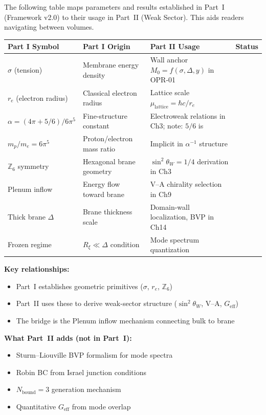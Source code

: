 The following table maps parameters and results established in Part~I (Framework v2.0)
to their usage in Part~II (Weak Sector). This aids readers navigating between volumes.

\begin{tcolorbox}[breakable, enhanced, colback=blue!3!white, colframe=blue!50!black,
    title=\textbf{Part I $\leftrightarrow$ Part II Parameter Bridge}, width=\linewidth]
\small
\renewcommand{\arraystretch}{1.3}
\begin{tabularx}{\linewidth}{@{}>{\raggedright\arraybackslash}p{2.5cm} >{\raggedright\arraybackslash}p{3cm} >{\raggedright\arraybackslash}X >{\raggedright\arraybackslash}p{1.5cm}@{}}
\toprule
\textbf{Part I Symbol} & \textbf{Part I Origin} & \textbf{Part II Usage} & \textbf{Status} \\
\midrule
$\sigma$ (tension) & Membrane energy density & Wall anchor $M_0 = f(\sigma, \Delta, y)$ in OPR-01 & \tagP{} \\
$r_e$ (electron radius) & Classical electron radius & Lattice scale $\mu_{\text{lattice}} = \hbar c / r_e$ & \tagBL{} \\
$\alpha = (4\pi + 5/6)/6\pi^5$ & Fine-structure constant & Electroweak relations in Ch3; note: $5/6$ is \tagP{} & \tagDc{} \\
$m_p/m_e = 6\pi^5$ & Proton/electron mass ratio & Implicit in $\alpha^{-1}$ structure & \tagDer{} \\
$\mathbb{Z}_6$ symmetry & Hexagonal brane geometry & $\sin^2\theta_W = 1/4$ derivation in Ch3 & \tagI{} \\
Plenum inflow & Energy flow toward brane & V--A chirality selection in Ch9 & \tagP{} \\
Thick brane $\Delta$ & Brane thickness scale & Domain-wall localization, BVP in Ch14 & \tagP{} \\
Frozen regime & $R_\xi \ll \Delta$ condition & Mode spectrum quantization & \tagP{} \\
\bottomrule
\end{tabularx}

\medskip
\textbf{Key relationships:}
\begin{itemize}[nosep]
    \item Part~I establishes geometric primitives ($\sigma$, $r_e$, $\mathbb{Z}_6$)
    \item Part~II uses these to derive weak-sector structure ($\sin^2\theta_W$, V--A, $G_{\text{eff}}$)
    \item The bridge is the Plenum inflow mechanism connecting bulk to brane
\end{itemize}

\textbf{What Part~II adds (not in Part~I):}
\begin{itemize}[nosep]
    \item Sturm--Liouville BVP formalism for mode spectra
    \item Robin BC from Israel junction conditions
    \item $N_{\text{bound}} = 3$ generation mechanism
    \item Quantitative $G_{\text{eff}}$ from mode overlap
\end{itemize}
\end{tcolorbox}

